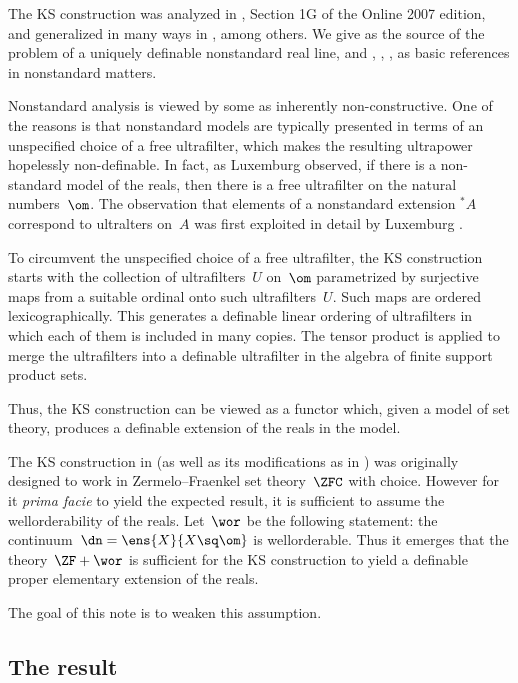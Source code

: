\documentclass[11pt,
]{article}
\begin{document}
The KS construction was analyzed in \cite{Ke76}, Section 1G of the
Online 2007 edition, and generalized in many ways in
\cite{herz,klyub,kusp}, \cite[Chapter 4]{krbook} among others.  We
give \cite{keis} as the source of the problem of a uniquely definable
nonstandard real line, and \cite{lux}, \cite{SL}, \cite{Da77},
\cite{HL} as basic references in nonstandard matters.

Nonstandard analysis is viewed by some as inherently non-constructive.
One of the reasons is that nonstandard models are typically presented
in terms of an unspecified choice of a free ultrafilter, which makes
the resulting ultrapower hopelessly non-definable.  In fact, as
Luxemburg \cite{lux} observed, if there is a non-standard model of the
reals, then there is a free ultrafilter on the natural numbers~$\om$.
The observation that elements of a nonstandard extension
${}^{\ast}\!\!A$ correspond to ultralters on~$A$ was first exploited
in detail by Luxemburg \cite{Lu69}.

To circumvent the unspecified choice of a free ultrafilter, the KS
construction starts with the collection of ultrafilters~$U$ on~$\om$
parametrized by surjective maps from a suitable ordinal onto such
ultrafilters~$U$.  Such maps are ordered lexicographically.  This
generates a definable linear ordering of ultrafilters in which each of
them is included in many copies.  The tensor product is applied to
merge the ultrafilters into a definable ultrafilter in the algebra of
finite support product sets.

Thus, the KS construction can be viewed as a functor which, 
given a model of set theory, produces a definable extension 
of the reals in the model. 


The KS construction in \cite{KS}
(as well as its modifications as in \cite{herz,kusp}) 
was originally designed to work in Zermelo--Fraenkel 
set theory~$\ZFC$ with choice.  
However for it {\sl prima facie\/} to yield the  
expected result, it is sufficient to assume the 
wellorderability of the reals. 
%  
Let~$\wor$ be the following statement: the
continuum~$\dn=\ens{X}{X\sq\om}$ is wellorderable.  Thus it emerges
that the theory~$\ZF + \wor$ is sufficient for the KS construction to
yield a definable proper elementary extension of the reals.
 
The goal of this note is to weaken this assumption.



\subsection{The result}
\label{res}
\end{document}
